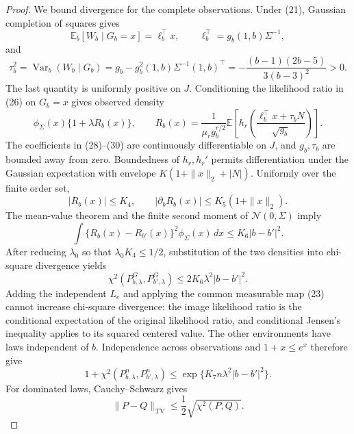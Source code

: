 \documentclass{article}
\begin{document}
\begin{proof}
We bound divergence for the complete observations.  Under (21), Gaussian completion of squares gives
\[
 \mathbb E_b[W_b\mid G_b=x]=\ell_b^\top x,
 \qquad \ell_b^\top=g_b(1,b)\Sigma^{-1},                                 \tag{28}
\]
and
\[
 \tau_b^2=\operatorname{Var}_b(W_b\mid G_b)
 =g_b-g_b^2(1,b)\Sigma^{-1}(1,b)^\top
 =-\frac{(b-1)(2b-5)}{3(b-3)^2}>0.                                       \tag{29}
\]
The last quantity is uniformly positive on \(J\).  Conditioning the likelihood ratio in (26) on \(G_b=x\) gives observed density
\[
 \phi_\Sigma(x)\{1+\lambda R_b(x)\},
 \qquad
 R_b(x)=\frac1{\mu_rg_b^{r/2}}
 \mathbb E\left[h_r\!\left(
 \frac{\ell_b^\top x+\tau_bN}{\sqrt{g_b}}\right)\right].               \tag{30}
\]
The coefficients in (28)--(30) are continuously differentiable on \(J\), and \(g_b,\tau_b\) are bounded away from zero.  Boundedness of \(h_r,h_r'\) permits differentiation under the Gaussian expectation with envelope \(K(1+\|x\|_2+|N|)\).  Uniformly over the finite order set,
\[
 |R_b(x)|\leq K_4,
 \qquad |\partial_bR_b(x)|\leq K_5(1+\|x\|_2).                           \tag{31}
\]
The mean-value theorem and the finite second moment of \(\mathcal N(0,\Sigma)\) imply
\[
 \int\{R_b(x)-R_{b'}(x)\}^2\phi_\Sigma(x)\,dx
 \leq K_6|b-b'|^2.                                                        \tag{32}
\]
After reducing \(\lambda_0\) so that \(\lambda_0K_4\leq1/2\), substitution of the two densities into chi-square divergence yields
\[
 \chi^2(P^G_{b,\lambda},P^G_{b',\lambda})
 \leq2K_6\lambda^2|b-b'|^2.                                              \tag{33}
\]
Adding the independent \(L_e\) and applying the common measurable map (23) cannot increase chi-square divergence: the image likelihood ratio is the conditional expectation of the original likelihood ratio, and conditional Jensen's inequality applies to its squared centered value.  The other environments have laws independent of \(b\).  Independence across observations and \(1+x\leq e^x\) therefore give
\[
 1+\chi^2(P_{b,\lambda}^{n},P_{b',\lambda}^{n})
 \leq\exp\{K_7n\lambda^2|b-b'|^2\}.                                    \tag{34}
\]
For dominated laws, Cauchy--Schwarz gives
\[
 \|P-Q\|_{\mathrm{TV}}\leq\frac12\sqrt{\chi^2(P,Q)}.                  \tag{35}
\]


\end{proof}
\end{document}
